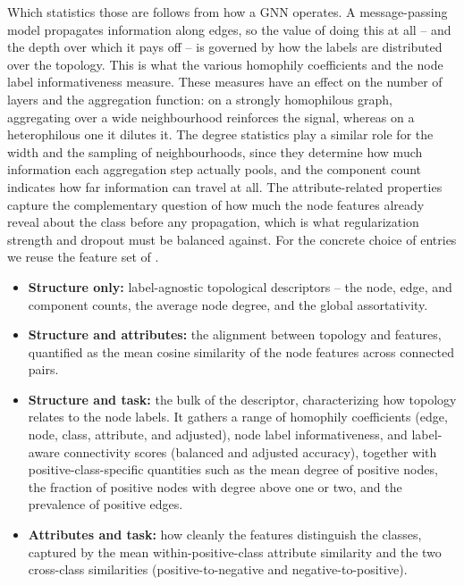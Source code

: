 Which statistics those are follows from how a GNN operates. A message-passing model propagates information along edges, so the value of doing this at all -- and the depth over which it pays off -- is governed by how the labels are distributed over the topology. This is what the various homophily coefficients and the node label informativeness measure. These measures have an effect on the number of layers and the aggregation function: on a strongly homophilous graph, aggregating over a wide neighbourhood reinforces the signal, whereas on a heterophilous one it dilutes it. The degree statistics play a similar role for the width and the sampling of neighbourhoods, since they determine how much information each aggregation step actually pools, and the component count indicates how far information can travel at all. The attribute-related properties capture the complementary question of how much the node features already reveal about the class before any propagation, which is what regularization strength and dropout must be balanced against. For the concrete choice of entries we reuse the feature set of \cite{dedic_benchmarking_2026}.

\begin{itemize}
	\item \textbf{Structure only:} label-agnostic topological descriptors -- the node, edge, and component counts, the average node degree, and the global assortativity.
	\item \textbf{Structure and attributes:} the alignment between topology and features, quantified as the mean cosine similarity of the node features across connected pairs.
	\item \textbf{Structure and task:} the bulk of the descriptor, characterizing how topology relates to the node labels. It gathers a range of homophily coefficients (edge, node, class, attribute, and adjusted), node label informativeness, and label-aware connectivity scores (balanced and adjusted accuracy), together with positive-class-specific quantities such as the mean degree of positive nodes, the fraction of positive nodes with degree above one or two, and the prevalence of positive edges.
	\item \textbf{Attributes and task:} how cleanly the features distinguish the classes, captured by the mean within-positive-class attribute similarity and the two cross-class similarities (positive-to-negative and negative-to-positive).
\end{itemize}
